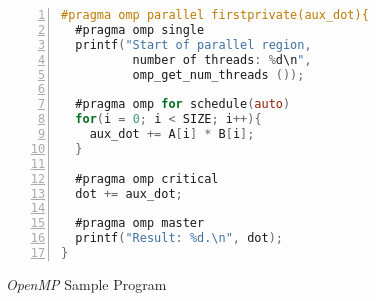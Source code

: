 \begin{figure}[htb]
\begin{minipage}{\linewidth}
\begin{lstlisting}[language=C, basicstyle=\ttfamily\scriptsize, numbers=left,
                   frame=no, showspaces=false, showstringspaces=false,
                   numberstyle=\tiny,
                   xleftmargin=0.6cm, frame=trBL,
                   keywords={%
                       \#pragma,
                       omp, parallel, firstprivate,
                       single, omp_get_num_threads,
                       for, schedule, auto,
                       critical, master,
                       NULL, int, main,
                       void, printf, return%
                   },
                   otherkeywords={::, \#pragma, \#include, <<<,>>>, \&, \*, +, -, /, [, ], >, <}
                       ]
#pragma omp parallel firstprivate(aux_dot){
  #pragma omp single
  printf("Start of parallel region,
          number of threads: %d\n",
          omp_get_num_threads ());

  #pragma omp for schedule(auto)
  for(i = 0; i < SIZE; i++){
    aux_dot += A[i] * B[i];
  }

  #pragma omp critical
  dot += aux_dot;

  #pragma omp master
  printf("Result: %d.\n", dot);
}
\end{lstlisting}
\end{minipage}
\caption{\textit{OpenMP} Sample Program}
\label{lst:omp}
\end{figure}



